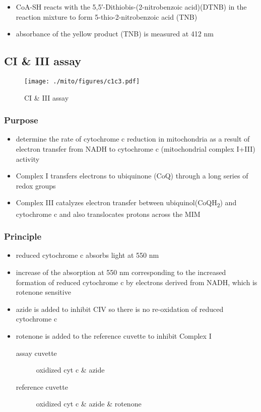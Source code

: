 \documentclass[12pt]{scrartcl}
\begin{document}
\begin{itemize}
\item CoA-SH reacts with the 5,5′-Dithiobis-(2-nitrobenzoic acid)(DTNB) in
the reaction mixture to form 5-thio-2-nitrobenzoic acid (TNB)
\end{itemize}


\begin{itemize}
\item absorbance of the yellow product (TNB) is measured at 412 nm
\end{itemize}

\subsection{CI \& III assay}
\label{sec:org82f7ad3}
\begin{figure}[htbp]
\centering
\texttt{[image: ./mito/figures/c1c3.pdf]}
\caption{\label{fig:org569f410}CI \& III assay}
\end{figure}


\subsubsection{Purpose}
\label{sec:org7bebfbc}
\begin{itemize}
\item determine the rate of cytochrome c reduction in mitochondria as a
result of electron transfer from NADH to cytochrome c (mitochondrial
complex I+III) activity
\item Complex I transfers electrons to ubiquinone (CoQ) through a
long series of redox groups
\item Complex III catalyzes electron transfer between ubiquinol(CoQH\textsubscript{2})
and cytochrome c and also translocates protons across the MIM
\end{itemize}

\subsubsection{Principle}
\label{sec:org36a1fb0}
\begin{itemize}
\item reduced cytochrome c absorbs light at 550 nm
\item increase of the absorption at 550 nm corresponding to the increased
formation of reduced cytochrome c by electrons derived from NADH,
which is rotenone sensitive
\item azide is added to inhibit CIV so there is no re-oxidation of reduced cytochrome c
\item rotenone is added to the reference cuvette to inhibit Complex I
\begin{description}
\item[{assay cuvette}] oxidized cyt c \& azide
\item[{reference cuvette}] oxidized cyt c \& azide \& rotenone
\end{description}
\end{itemize}
\end{document}
